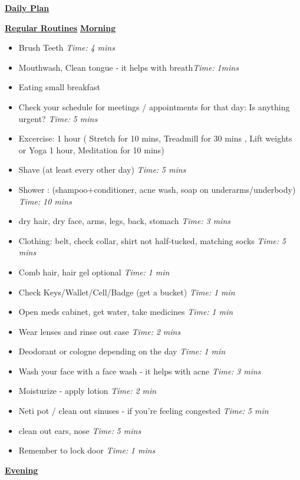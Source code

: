 \documentclass[serif,mathserif,final]{beamer}
\newcommand{\timeEst}[1]{\textit{Time:} \textit{#1}}
\begin{document}
\begin{frame}{}
\begin{columns}[t]
\begin{column}{0.33\linewidth}{\textbf{\underline{Daily Plan}}}
\begin{block}{\small \textbf{\underline{Regular Routines}} }
\underline{\textbf{Morning}}
\begin{itemize}
\item \tiny Brush Teeth \timeEst{4 mins}
\item \tiny Mouthwash, Clean tongue - it helps with breath\timeEst{1mins} 
\item \tiny Eating small breakfast
\item \tiny Check your schedule for meetings / appointments for that day: Is anything urgent? \timeEst{5 mins}
\item \tiny Excercise: 1 hour ( Stretch for 10 mins, Treadmill for 30 mins , Lift weights or Yoga 1 hour, Meditation for 10 mins)
\item \tiny Shave (at least every other day) \timeEst{5 mins}
\item \tiny Shower : (shampoo+conditioner, acne wash,  soap on underarms/underbody)
\timeEst{10 mins}
\item \tiny dry hair, dry face, arms, legs, back, stomach \timeEst{3 mins}
\item \tiny Clothing: belt, check collar, shirt not half-tucked, matching socks \timeEst{5 mins}
\item \tiny Comb hair, hair gel optional \timeEst{ 1 min}
\item \tiny Check Keys/Wallet/Cell/Badge (get a bucket) \timeEst{1 min}
\item \tiny Open meds cabinet, get water, take medicines \timeEst{1 min}
\item \tiny Wear lenses and rinse out case \timeEst{ 2 mins}
\item \tiny Deodorant or cologne depending on the day \timeEst{1 min}
\item \tiny Wash your face with a face wash - it helps with acne \timeEst{3 mins}
\item \tiny Moisturize - apply lotion \timeEst{ 2 min}
\item \tiny Neti pot / clean out sinuses - if you’re feeling congested \timeEst{5 min}
\item \tiny clean out ears, nose \timeEst{5 mins}
\item \tiny Remember to lock door \timeEst{1 mins}
\end{itemize}

\underline{\textbf{Evening}}


\end{block}
\end{column}
\end{columns}
\end{frame}
\end{document}

